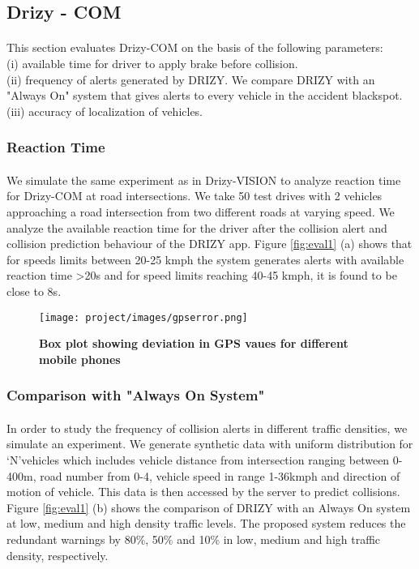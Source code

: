 \subsection{Drizy - COM}
\paragraph{}This section evaluates Drizy-COM on the basis of the following parameters:\\
(i) available time for driver to apply brake before collision.\\
(ii) frequency of alerts generated by DRIZY. We compare DRIZY with an "Always On" system that gives alerts to every vehicle in the accident blackspot.\\
(iii) accuracy of localization of vehicles. 

\subsubsection{Reaction Time}
\paragraph{}We simulate the same experiment as in Drizy-VISION to analyze reaction time for Drizy-COM at road intersections. We take 50 test drives with 2 vehicles approaching a road intersection from two different roads at varying speed. We analyze the available reaction time for the driver after the collision alert and collision prediction behaviour of the DRIZY app.
Figure \ref{fig:eval1} (a) shows that for speeds limits between 20-25 kmph the system generates alerts with available reaction time >20s and for speed limits reaching 40-45 kmph, it is found to be close to 8s.

\begin{figure}[hbtp]
\centering
{
\texttt{[image: project/images/gpserror.png]}
\caption{\textbf{Box plot showing deviation in GPS vaues for different mobile phones}
\label{fig:gps}
}}
\end{figure}
\subsubsection{Comparison with "Always On System"}
\paragraph{}In order to study the frequency of collision alerts in different traffic densities, we simulate an experiment. We generate synthetic data with uniform distribution for \lq{N}\rq vehicles which includes vehicle distance from intersection ranging between 0-400m, road number from 0-4, vehicle speed in range 1-36kmph and direction of motion of vehicle. This data is then accessed by the server to predict collisions. Figure \ref{fig:eval1} (b) shows the comparison of DRIZY with an Always On system at low, medium and high density traffic levels. The proposed system reduces the redundant warnings by 80\%, 50\% and 10\% in low, medium and high traffic density, respectively.

